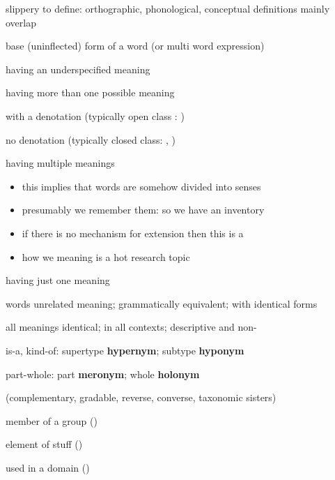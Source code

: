 \documentclass[headrule,footrule]{foils}
\begin{document}
\begin{description}
\item {} slippery to define: orthographic, phonological, conceptual definitions mainly overlap
\item  {} base (uninflected) form of a word (or multi word expression)
\item  {} having an underspecified meaning
\item  {} having more than one possible meaning
\item  {} with a denotation (typically open class : )
\item  {} no denotation (typically closed class:
  , )
\end{description}


\begin{description}
\item  {} having multiple meanings
  \begin{itemize}
  \item this implies that words are somehow divided into senses
  \item presumably we remember them: so we have an inventory
  \item if there is no mechanism for extension then this is a
  \item how we  meaning  is a hot research topic
  \end{itemize}
\item  {} having just one meaning
\item  {} words unrelated meaning; grammatically equivalent;
  with identical forms
\end{description} 


\begin{description}
\item {}  all meanings identical; in all contexts; descriptive and non-
\item {} is-a, kind-of: supertype \textbf{hypernym}; subtype \textbf{hyponym}
\item {} part-whole: part \textbf{meronym}; whole \textbf{holonym}
\item {} (complementary, gradable, reverse, converse, taxonomic sisters)
\item {} member of a group ()
\item {} element of stuff ()
\item {}  used in a domain ()
\end{description}
\end{document}
